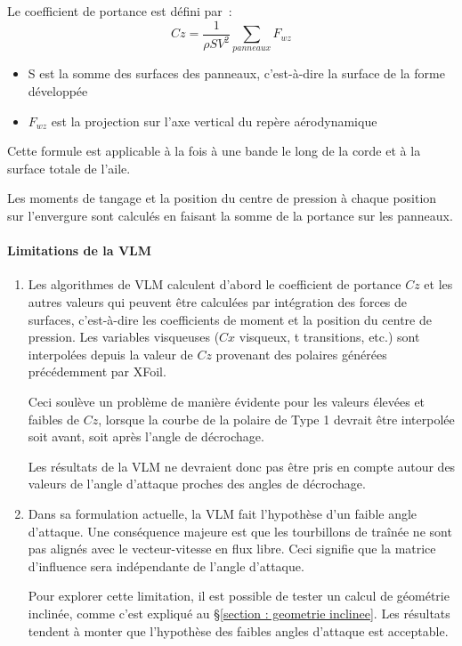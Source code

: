 \documentclass[a4paper,twoside,12pt,dvips]{article}
\begin{document}
Le coefficient de portance est défini par~:
$$Cz = \frac {1} {\rho S V^2} \underset{panneaux}\sum F_{wz} $$

\begin{itemize}[label=]
	\item S est la somme des surfaces des panneaux, c’est-à-dire la surface de
	la forme développée
	\item $F_{wz}$ est la projection sur l’axe vertical du repère aérodynamique
\end{itemize}

Cette formule est applicable à la fois à une bande le long de la corde et à 
la surface totale de l’aile.

Les moments de tangage et la position du centre de pression à chaque 
position sur l’envergure sont calculés en faisant la somme de la portance
sur les panneaux.

\paragraph{Limitations de la VLM}

\begin{enumerate}
	\item Les algorithmes de VLM calculent d’abord le coefficient de portance 
	$Cz$ et les autres valeurs qui peuvent être calculées par intégration des 
	forces de surfaces, c’est-à-dire les coefficients de moment et la position
	du centre de pression. Les variables visqueuses ($Cx$ visqueux, t
	transitions, etc.) sont interpolées depuis la valeur de $Cz$ provenant des
	polaires générées précédemment par XFoil.\par
	Ceci soulève un problème de manière évidente pour les valeurs élevées et 
	faibles de $Cz$, lorsque la courbe de la polaire de Type 1 devrait être 
	interpolée soit avant, soit après l’angle de décrochage.\par
	Les résultats de la VLM ne devraient donc pas être pris en compte autour des
	valeurs de l’angle d’attaque proches des angles de décrochage.
	\item Dans sa formulation actuelle, la VLM fait l’hypothèse d’un faible 
	angle d’attaque. Une conséquence majeure est que les tourbillons de traînée 
	ne sont pas alignés avec le vecteur-vitesse en flux libre. Ceci signifie que 
	la matrice d’influence sera indépendante de l’angle d’attaque.\par
	Pour explorer cette limitation, il est possible de tester un calcul de 
	géométrie inclinée, comme c’est expliqué au 
	\S\ref{section : geometrie inclinee}. Les résultats tendent à monter que 
	l’hypothèse des faibles angles d’attaque est acceptable.
\end{enumerate}
\end{document}
